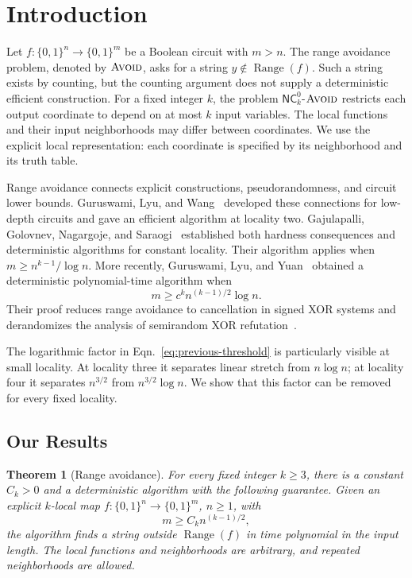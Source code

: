 \documentclass[letterpaper,11pt]{article}
\newtheorem{theorem}{Theorem}
\theoremstyle{definition}
\newcommand{\NC}{\mathsf{NC}}
\newcommand{\Avoid}{\textnormal{\textsc{Avoid}}}
\DeclareMathOperator{\Range}{Range}
\begin{document}
\section{Introduction}
\label{sec:introduction}

Let $f:\{0,1\}^n\to\{0,1\}^m$ be a Boolean circuit with $m>n$.
The range avoidance problem, denoted by $\Avoid$, asks for a string
$y\notin\Range(f)$. Such a string exists by counting, but the counting
argument does not supply a deterministic efficient construction.
For a fixed integer $k$, the problem $\NC^0_k$-$\Avoid$ restricts
each output coordinate to depend on at most $k$ input variables.
The local functions and their input neighborhoods may differ between
coordinates. We use the explicit local representation: each coordinate
is specified by its neighborhood and its truth table.

Range avoidance connects explicit constructions, pseudorandomness,
and circuit lower bounds. Guruswami, Lyu, and Wang~\cite{GLW22}
developed these connections for low-depth circuits and gave an
efficient algorithm at locality two. Gajulapalli, Golovnev, Nagargoje,
and Saraogi~\cite{GGNS23} established both hardness consequences and
deterministic algorithms for constant locality. Their algorithm applies
when $m\ge n^{k-1}/\log n$. More recently, Guruswami, Lyu, and
Yuan~\cite[Theorem~5]{GLY26} obtained a deterministic polynomial-time
algorithm when
\begin{equation}
 m\ge c^k n^{(k-1)/2}\log n.
 \label{eq:previous-threshold}
\end{equation}
Their proof reduces range avoidance to cancellation in signed XOR
systems and derandomizes the analysis of semirandom XOR
refutation~\cite{GKM22,HKM23}.

The logarithmic factor in Eqn.~\eqref{eq:previous-threshold} is
particularly visible at small locality. At locality three it separates
linear stretch from $n\log n$; at locality four it separates
$n^{3/2}$ from $n^{3/2}\log n$. We show that this factor can be
removed for every fixed locality.

\subsection{Our Results}

\begin{theorem}[Range avoidance]
\label{thm:avoid}
For every fixed integer $k\ge3$, there is a constant $C_k>0$ and a
deterministic algorithm with the following guarantee. Given an explicit
$k$-local map $f:\{0,1\}^n\to\{0,1\}^m$, $n\ge1$, with
\begin{equation}
 m\ge C_k n^{(k-1)/2},
 \label{eq:main-stretch}
\end{equation}
the algorithm finds a string outside $\Range(f)$ in time polynomial in
the input length. The local functions and neighborhoods are arbitrary,
and repeated neighborhoods are allowed.
\end{theorem}
\end{document}
